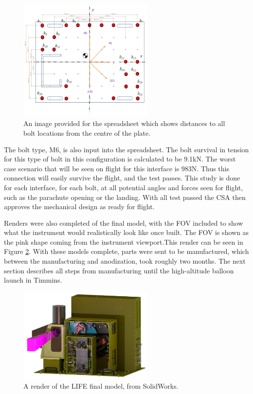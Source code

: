 \begin{figure}
    \centering
    \includegraphics[width=0.6\textwidth]{chap3_images/mech_justification_baseplate_figure.PNG}
    \caption{An image provided for the spreadsheet which shows distances to all bolt locations from the centre of the plate.}
    \label{fig:mech_justification_bolt_hole_locations}
\end{figure}

The bolt type, M6, is also input into the spreadsheet. The bolt survival in tension for this type of bolt in this configuration is calculated to be  9.1kN. The worst case scenario that will be seen on flight for this interface is 983N. Thus this connection will easily survive the flight, and the test passes. This study is done for each interface, for each bolt, at all potential angles and forces seen for flight, such as the parachute opening or the landing. With all test passed the CSA then approves the mechanical design as ready for flight.

Renders were also completed of the final model, with the FOV included to show what the instrument would realistically look like once built. The FOV is shown as the pink shape coming from the instrument viewport.This render can be seen in Figure \ref{fig:LIFE_FINAL_RENDER}. With these models complete, parts were sent to be manufactured, which between the manufacturing and anodization, took roughly two months. The next section describes all steps from manufacturing until the high-altitude balloon launch in Timmins.

\begin{figure}
    \centering
    \includegraphics[width=0.6\textwidth]{chap3_images/LIFE_V5_final_images/side_view_bbebox.png}
    \caption{A render of the LIFE final model, from SolidWorks.}
    \label{fig:LIFE_FINAL_RENDER}
\end{figure}

